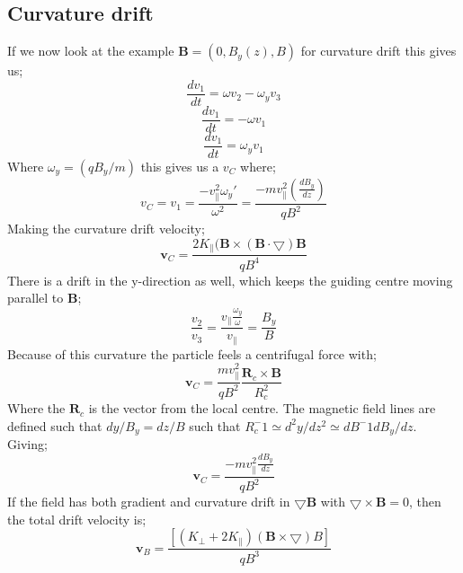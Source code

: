 \documentclass[14paper,11pt,hidelinks]{article}
\begin{document}
\subsection{Curvature drift}
If we now look at the example \begin{math} \mathbf{B}=(0,B_y(z),B) \end{math} for curvature drift this gives us;
\begin{equation}
\frac{dv_1}{dt}=\omega v_2-\omega_{y}v_3
\end{equation}
\begin{equation}
\frac{dv_1}{dt}=-\omega v_1
\end{equation}
\begin{equation}
\frac{dv_1}{dt}=\omega_{y}v_1
\end{equation}
Where \begin{math} \omega_{y}=(qB_{y}/m) \end{math} this gives us a \begin{math} v_C \end{math} where;
\begin{equation}
v_C=v_1=\frac{-v_\parallel^2\omega_y'}{\omega^2}=\frac{-m v_\parallel^2\left(\frac{dB_y}{dz}\right)}{qB^2}
\end{equation}
Making the curvature drift velocity;
\begin{equation}
\mathbf{v}_C=\frac{2K_\parallel(\mathbf{B}\times(\mathbf{B}\cdot \bigtriangledown)\mathbf{B}}{qB^4}
\end{equation}
There is a drift in the y-direction as well, which keeps the guiding centre moving parallel to \textbf{B};
\begin{equation}
\frac{v_2}{v_3}=\frac{v_\parallel\frac{\omega_y}{\omega}}{v_\parallel}=\frac{B_y}{B}
\end{equation}
Because of this curvature the particle feels a centrifugal force with;
\begin{equation}
\mathbf{v}_C=\frac{m v_\parallel^2}{qB^2}\frac{\mathbf{R}_c\times\mathbf{B}}{R_c^2}
\end{equation}
Where the \begin{math} \mathbf{R}_c \end{math} is the vector from the local centre. The magnetic field lines are defined such that \begin{math}dy/B_y=dz/B\end{math} such that \begin{math} R_c^-1\simeq d^2y/dz^2\simeq dB^-1dB_y/dz \end{math}. Giving;
\begin{equation}
\mathbf{v}_C=\frac{-m v_\parallel^2\frac{dB_y}{dz}}{qB^2}
\end{equation}
If the field has both gradient and curvature drift in \begin{math} \bigtriangledown\mathbf{B} \end{math} with \begin{math} \bigtriangledown\times\mathbf{B}=0\end{math}, then the total drift velocity is;
\begin{equation}
\mathbf{v}_B=\frac{\left[(K_\bot+2K_\parallel)(\mathbf{B}\times\bigtriangledown)B\right]}{q B^3} 
\end{equation}
\end{document}

